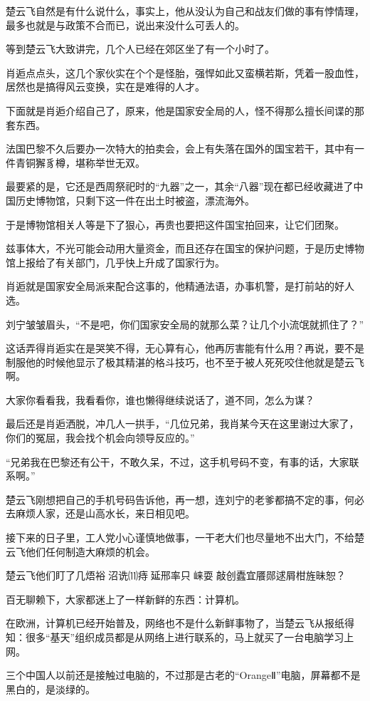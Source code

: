 楚云飞自然是有什么说什么，事实上，他从没认为自己和战友们做的事有悖情理，最多也就是与政策不合而已，说出来没什么可丢人的。

等到楚云飞大致讲完，几个人已经在郊区坐了有一个小时了。

肖逅点点头，这几个家伙实在个个是怪胎，强悍如此又蛮横若斯，凭着一股血性，居然也是搞得风云变换，实在是难得的人才。

下面就是肖逅介绍自己了，原来，他是国家安全局的人，怪不得那么擅长间谍的那套东西。

法国巴黎不久后要办一次特大的拍卖会，会上有失落在国外的国宝若干，其中有一件青铜獬豸樽，堪称举世无双。

最要紧的是，它还是西周祭祀时的“九器”之一，其余“八器”现在都已经收藏进了中国历史博物馆，只剩下这一件在出土时被盗，漂流海外。

于是博物馆相关人等是下了狠心，再贵也要把这件国宝拍回来，让它们团聚。

兹事体大，不光可能会动用大量资金，而且还存在国宝的保护问题，于是历史博物馆上报给了有关部门，几乎快上升成了国家行为。

肖逅就是国家安全局派来配合这事的，他精通法语，办事机警，是打前站的好人选。

刘宁皱皱眉头，“不是吧，你们国家安全局的就那么菜？让几个小流氓就抓住了？”

这话弄得肖逅实在是哭笑不得，无心算有心，他再厉害能有什么用？再说，要不是制服他的时候他显示了极其精湛的格斗技巧，也不至于被人死死咬住他就是楚云飞啊。

大家你看看我，我看看你，谁也懒得继续说话了，道不同，怎么为谋？

最后还是肖逅洒脱，冲几人一拱手，“几位兄弟，我肖某今天在这里谢过大家了，你们的冤屈，我会找个机会向领导反应的。”

“兄弟我在巴黎还有公干，不敢久呆，不过，这手机号码不变，有事的话，大家联系啊。”

楚云飞刚想把自己的手机号码告诉他，再一想，连刘宁的老爹都搞不定的事，何必去麻烦人家，还是山高水长，来日相见吧。

接下来的日子里，工人党小心谨慎地做事，一干老大们也尽量地不出大门，不给楚云飞他们任何制造大麻烦的机会。

楚云飞他们盯了几焐裕沼诜⑾痔延邢率只崃耍敲创蠹宜餍郧逑屑柑旌昧恕？

百无聊赖下，大家都迷上了一样新鲜的东西：计算机。

在欧洲，计算机已经开始普及，网络也不是什么新鲜事物了，当楚云飞从报纸得知：很多“基天”组织成员都是从网络上进行联系的，马上就买了一台电脑学习上网。

三个中国人以前还是接触过电脑的，不过那是古老的“OrangeⅡ”电脑，屏幕都不是黑白的，是淡绿的。

